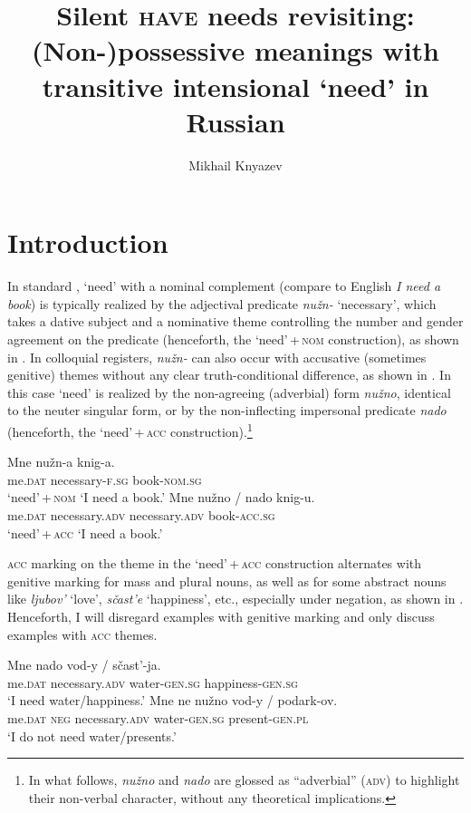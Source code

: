 \documentclass[output=paper]{langscibook}
\author{Mikhail Knyazev\orcid{0000-0003-4652-4144}\affiliation{Institute for Linguistic Studies RAS, Saint Petersburg;National Research University Higher School of Economics, Saint Petersburg}}
\title[Silent \textsc{have} needs revisiting]
      {Silent \textsc{have} needs revisiting: (Non-)possessive meanings with transitive intensional `need' in Russian}
\begin{document}
\maketitle

\section{Introduction}\label{section-intro}

In standard , `need' with a nominal complement (compare to English \textit{I need a book}) is typically realized by the adjectival predicate \textit{nužn-} `necessary', which takes a dative subject and a nominative theme controlling the number and gender agreement on the predicate (henceforth, the `need'\,+\,\textsc{nom} construction), as shown in . In colloquial registers, \textit{nužn-} can also occur with accusative (sometimes genitive) themes without any clear truth-conditional difference, as shown in . In this case `need' is realized by the non-agreeing (adverbial) form \textit{nužno}, identical to the neuter singular form, or by the non-inflecting impersonal predicate \textit{nado} (henceforth, the `need'\,+\,\textsc{acc} construction).\footnote{In what follows, \textit{nužno} and \textit{nado} are glossed as ``adverbial'' (\textsc{adv}) to highlight their non-verbal character, without any theoretical implications.}\largerpage

\ea
\ea \gll Mne nužn-a knig-a.\\
     me.\textsc{dat} necessary-\textsc{f.sg} book-\textsc{nom.sg}\\ \hfill `need'\,+\,\textsc{nom}
\glt `I need a book.'\label{need-nom}
\ex \gll Mne nužno / nado knig-u.\\
     me.\textsc{dat} necessary.\textsc{adv} {} necessary.\textsc{adv} book-\textsc{acc.sg}\\ \hfill `need'\,+\,\textsc{acc}
\glt `I need a book.'\label{need-acc}
\z \z

\noindent \textsc{acc} marking on the theme in the `need'\,+\,\textsc{acc} construction alternates with genitive marking for mass and plural nouns, as well as for some abstract nouns like \textit{ljubov'} `love', \textit{sčast'e} `happiness', etc., especially under negation, as shown in . Henceforth, I will disregard examples with genitive marking and only discuss examples with \textsc{acc} themes.

\ea\label{need-gen}
\ea \gll Mne nado vod-y / sčast'-ja.\\
     me.\textsc{dat} necessary.\textsc{adv} water-\textsc{gen.sg} {} happiness-\textsc{gen.sg}\\
\glt `I need water/happiness.'
\ex \gll Mne ne nužno vod-y / podark-ov.\\
     me.\textsc{dat} \textsc{neg} necessary.\textsc{adv} water-\textsc{gen.sg}  {} present-\textsc{gen.pl}\\
\glt `I do not need water/presents.'
\z\z
\end{document}

